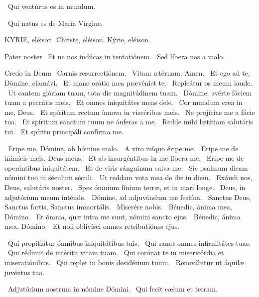  \V\ Qui ventúrus es in mundum.


\V\ Qui natus es de María Vírgine.



KYRIE, eléison. Christe, eléison. Kýrie, eléison.

Pater noster  \V\ Et ne nos indúcas in tentatiónem. \R\ Sed líbera nos a malo.

Credo in Deum  \V\ Carnis resurrectiónem. \R\ Vitam ætérnam. Amen. \V\ Et ego ad te, Dómine, clamávi. \R\ Et mane orátio mea prævéniet te. \V\ Repleátur os meum laude. \R\ Ut cantem glóriam tuam, tota die magnitúdinem tuam. \V\ Dómine, avérte fáciem tuam a peccátis meis. \R\ Et omnes iniquitátes meas dele. \V\ Cor mundum crea in me, Deus. \R\ Et spíritum rectum ínnova in viscéribus meis. \V\ Ne projícias me a fácie tua. \R\ Et spíritum sanctum tuum ne áuferas a me. \V\ Redde mihi lætítiam salutáris tui. \R\ Et spíritu principáli confírma me.


\V\ Eripe me, Dómine, ab hómine malo. \R\ A viro iníquo éripe me. \V\ Eripe me de inimícis meis, Deus meus. \R\ Et ab insurgéntibus in me líbera me. \V\ Eripe me de operántibus iniquitátem. \R\ Et de viris sánguinum salva me. \V\ Sic psalmum dicam nómini tuo in séculum séculi. \R\ Ut reddam vota mea de die in diem. \V\ Exáudi nos, Deus, salutáris noster. \R\ Spes ómnium fínium terræ, et in mari longe. \V\ Deus, in adjutórium meum inténde. \R\ Dómine, ad adjuvándum me festína. \V\ Sanctus Deus, Sanctus fortis, Sanctus immortális. \R\ Miserére nobis. \V\ Bénedic, ánima mea, Dómino. \R\ Et ómnia, quæ intra me sunt, nómini sancto ejus. \V\ Bénedic, ánima mea, Dómino. \R\ Et noli oblivísci omnes retributiónes ejus.

\V\ Qui propitiátur ómnibus iniquitátibus tuis. \R\ Qui sanat omnes infirmitátes tuas. \V\ Qui rédimit de intéritu vitam tuam. \R\ Qui corónat te in misericórdia et miseratiónibus. \V\ Qui replet in bonis desidérium tuum. \R\ Renovábitur ut áquilæ juvéntus tua.


\V\ Adjutórium nostrum in nómine Dómini. \R\ Qui fecit cælum et terram.

